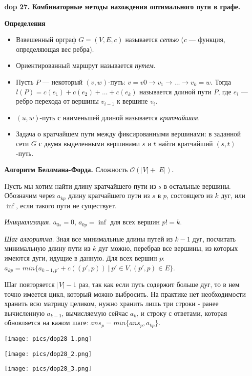 \textbf{\LARGE dop 27. Комбинаторные методы нахождения оптимального пути в графе.}

\textbf{Определения}

\begin{itemize}
    \item Взвешенный орграф $G = (V, E, c)$ называется \textit{сетью} ($c$ --- функция, определяющая вес ребра).
    \item Ориентированный маршрут называется \textit{путем}. 
    \item Пусть $P$ --- некоторый $(v, w)$-путь: $v = v 0 \rightarrow v_1 \rightarrow \dots \rightarrow v_k = w$. Тогда $l(P) = c(e_1) + c(e_2) + \dots + c(e_k)$ называется длиной пути $P$, где $e_i$ --- ребро перехода от вершины $v_{i-1}$ к вершине $v_i$. 
    \item $(u, w)$-путь с наименьшей длиной называется \textit{кратчайшим}.
    \item Задача о кратчайшем пути между фиксированными вершинами: в заданной сети $G$ с двумя выделенными вершинами $s$ и $t$ найти кратчайший $(s, t)$-путь.
\end{itemize}

\textbf{Алгоритм Беллмана-Форда.} 
Сложность $\mathcal{O}(|V| + |E|)$.

Пусть мы хотим найти длину кратчайшего пути из $s$ в остальные вершины. Обозначим через $a_{kp}$ длину кратчайшего пути из $s$ в $p$, состоящего из $k$ дуг, или $\inf$, если такого пути не существует.

\textit{Инициализация}. 
$a_{0s} = 0$, $a_{0p} = \inf$ для всех вершин $p != k$.

\textit{Шаг алгоритма}.
Зная все минимальные длины путей из $k-1$ дуг, посчитать минимальную длину пути из $k$ дуг можно, перебрав все вершины, из которых имеются дуги, идущие в данную. Для всех вершин $p$: $a_{kp} = min\{a_{k-1,p'} + c((p',p))~|~p' \in V, (p',p) \in E\}$. 

Шаг повторяется $|V| - 1$ раз, так как если путь содержит больше дуг, то в нем точно имеется цикл, который можно выбросить. На практике нет необходимости хранить всю матрицу целиком, нужно хранить лишь три строки - ранее вычисленную $a_{k-1}$, вычисляемую сейчас $a_k$, и строку с ответами, которая обновляется на кажом шаге: $ans_p = min\{ans_p, a_{kp}\}$.

\texttt{[image: pics/dop28\_1.png]}

\texttt{[image: pics/dop28\_2.png]}

\texttt{[image: pics/dop28\_3.png]}

